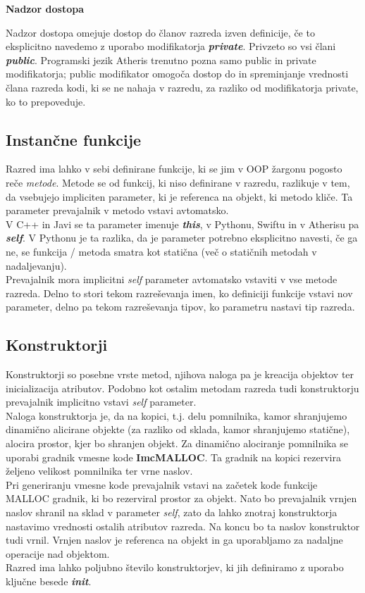 \documentclass[a4paper, 12p]{book}
\begin{document}
\textbf{Nadzor dostopa}

Nadzor dostopa omejuje dostop do članov razreda izven definicije, če to eksplicitno navedemo z uporabo modifikatorja \textit{\textbf{private}}. Privzeto so vsi člani \textit{\textbf{public}}. Programski jezik Atheris trenutno pozna samo public in private modifikatorja; public modifikator omogoča dostop do in spreminjanje vrednosti člana razreda kodi, ki se ne nahaja v razredu, za razliko od modifikatorja private, ko to prepoveduje. 

\subsection{Instančne funkcije}

Razred ima lahko v sebi definirane funkcije, ki se jim v OOP žargonu pogosto reče \textit{metode}. Metode se od funkcij, ki niso definirane v razredu, razlikuje v tem, da vsebujejo impliciten parameter, ki je referenca na objekt, ki metodo kliče. Ta parameter prevajalnik v metodo vstavi avtomatsko. \\
\indent V C++ in Javi se ta parameter imenuje \textbf{\textit{this}}, v Pythonu, Swiftu in v Atherisu pa \textbf{\textit{self}}. V Pythonu je ta razlika, da je parameter potrebno eksplicitno navesti, če ga ne, se funkcija / metoda smatra kot statična (več o statičnih metodah v nadaljevanju). \\
\indent Prevajalnik mora implicitni \textit{self} parameter avtomatsko vstaviti v vse metode razreda. Delno to stori tekom razreševanja imen, ko definiciji funkcije vstavi nov parameter, delno pa tekom razreševanja tipov, ko parametru nastavi tip razreda. \\

\subsection{Konstruktorji}

Konstruktorji so posebne vrste metod, njihova naloga pa je kreacija objektov ter inicializacija atributov. Podobno kot ostalim metodam razreda tudi konstruktorju prevajalnik implicitno vstavi \textit{self} parameter. \\
\indent Naloga konstruktorja je, da na kopici, t.j. delu pomnilnika, kamor shranjujemo dinamično alicirane objekte (za razliko od sklada, kamor shranjujemo statične), alocira prostor, kjer bo shranjen objekt. Za dinamično alociranje pomnilnika se uporabi gradnik vmesne kode \textbf{ImcMALLOC}. Ta gradnik na kopici rezervira željeno velikost pomnilnika ter vrne naslov. \\
\indent Pri generiranju vmesne kode prevajalnik vstavi na začetek kode funkcije MALLOC gradnik, ki bo rezerviral prostor za objekt. Nato bo prevajalnik vrnjen naslov shranil na sklad v parameter \textit{self}, zato da lahko znotraj konstruktorja nastavimo vrednosti ostalih atributov razreda. Na koncu bo ta naslov konstruktor tudi vrnil. Vrnjen naslov je referenca na objekt in ga uporabljamo za nadaljne operacije nad objektom. \\
\indent Razred ima lahko poljubno število konstruktorjev, ki jih definiramo z uporabo ključne besede \textit{\textbf{init}}. 
\end{document}
